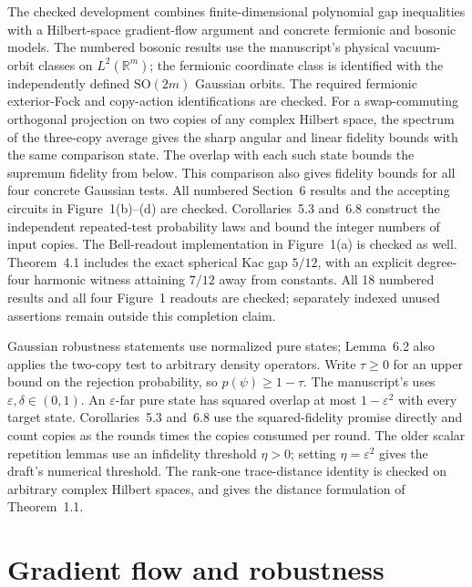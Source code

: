 The checked development combines finite-dimensional polynomial gap inequalities
with a Hilbert-space gradient-flow argument and concrete fermionic and bosonic
models. The numbered bosonic results use the manuscript's physical vacuum-orbit
classes on $L^2(\mathbb R^m)$; the fermionic coordinate class is identified
with the independently defined $\mathrm{SO}(2m)$ Gaussian orbits.
The required fermionic exterior-Fock and copy-action identifications are checked.
For a swap-commuting orthogonal
projection on two copies of any complex Hilbert space, the spectrum of the
three-copy average gives the sharp angular and linear fidelity bounds with
the same comparison state. The overlap with each such
state bounds the supremum fidelity from below. This comparison also gives
fidelity bounds for all four concrete Gaussian tests. All numbered Section~6
results and the accepting circuits in Figure~1(b)--(d) are checked.
Corollaries~5.3 and~6.8 construct the independent repeated-test probability laws
and bound the integer numbers of input copies. The Bell-readout implementation
in Figure~1(a) is checked as well. Theorem~4.1 includes the exact spherical
Kac gap $5/12$, with an explicit degree-four harmonic witness attaining
$7/12$ away from constants. All 18 numbered results and all four Figure~1
readouts are checked; separately indexed unused assertions remain outside
this completion claim.

Gaussian robustness statements use normalized pure states; Lemma~6.2
also applies the two-copy test to arbitrary density operators. Write $\tau\ge0$ for an upper
bound on the rejection probability, so $p(\psi)\ge1-\tau$. The manuscript's
 uses $\varepsilon,\delta\in(0,1)$.
An $\varepsilon$-far pure state has squared overlap at most $1-\varepsilon^2$
with every target state. Corollaries~5.3 and~6.8 use the squared-fidelity promise
directly and count copies as the rounds times the copies consumed per round.
The older scalar repetition lemmas use an infidelity threshold $\eta>0$;
setting $\eta=\varepsilon^2$ gives the draft's numerical threshold.
The rank-one trace-distance identity is checked on arbitrary complex Hilbert
spaces, and gives the distance formulation of Theorem~1.1.



\chapter{Gradient flow and robustness}\label{sec:flow}

